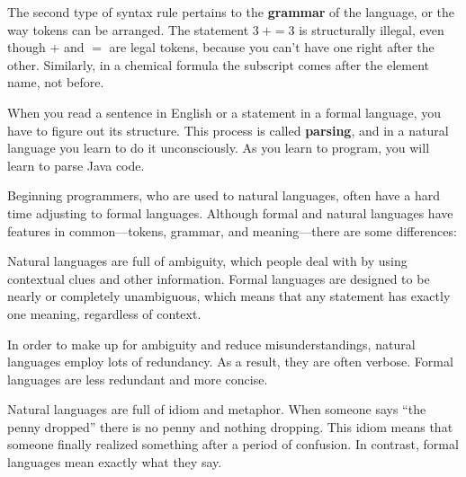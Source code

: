 
The second type of syntax rule pertains to the {\bf grammar} of the language, or the way tokens can be arranged.
The statement $3\ + = 3$ is structurally illegal, even though $+$ and $=$ are legal tokens, because you can't have one right after the other.
Similarly, in a chemical formula the subscript comes after the element name, not before.


When you read a sentence in English or a statement in a formal language, you have to figure out its structure.
This process is called {\bf parsing}, and in a natural language you learn to do it unconsciously.
As you learn to program, you will learn to parse Java code.



Beginning programmers, who are used to natural languages, often have a hard time adjusting to formal languages.
Although formal and natural languages have features in common---tokens, grammar, and meaning---there are some differences:

\begin{description}

Natural languages are full of ambiguity, which people deal with by using contextual clues and other information.
Formal languages are designed to be nearly or completely unambiguous, which means that any statement has exactly one meaning, regardless of context.

In order to make up for ambiguity and reduce misunderstandings, natural languages employ lots of redundancy.
As a result, they are often verbose.
Formal languages are less redundant and more concise.

Natural languages are full of idiom and metaphor.
When someone says ``the penny dropped'' there is no penny and nothing dropping.
This idiom means that someone finally realized something after a period of confusion.
In contrast, formal languages mean exactly what they say.

\end{description}

